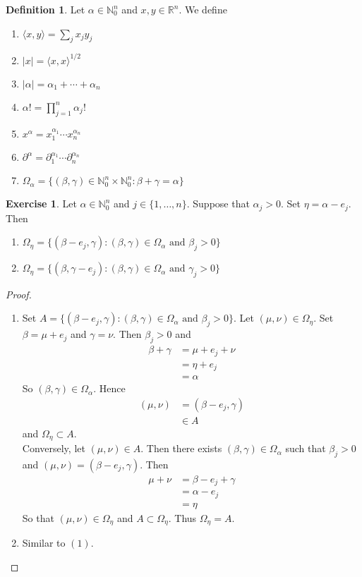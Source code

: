 \documentclass{book}
\theoremstyle{definition}
\newtheorem{defn}[definition]{Definition}
\newtheorem{ex}[definition]{Exercise}
\newcommand{\al}{\alpha}
\newcommand{\be}{\beta}
\newcommand{\gam}{\gamma}
\newcommand{\Om}{\Omega}
\newcommand{\N}{\mathbb{N}}
\newcommand{\R}{\mathbb{R}}
\newcommand{\ld}[1]{\label{defn:#1}}
\DeclareMathOperator*{\0}{\mbf{0}}
\DeclareMathOperator*{\1}{\mbf{1}}
\renewcommand{\r}{\rangle}
\renewcommand{\l}{\langle}
\newcommand{\p}{\partial}
\begin{document}
	\begin{defn}
		\ld{100} Let $\al \in \N_0^n$ and $x, y \in \R^n$. We define 
		\begin{enumerate}
			\item $\l x , y\r  = \sum_{j}x_jy_j$
			\item $|x| = \l x, x\r^{1/2}$
			\item $|\al| = \al_1 + \cdots + \al_n$
			\item $\al! = \prod\limits_{j=1}^n \al_j!$
			\item $x^\al = x_1^{\al_1}\cdots x_n^{\al_n}$
			\item $\p^{\al} = \p_1^{\al_1} \cdots \p_n^{\al_n}$
			\item $\Om_{\al} = \{(\be, \gam) \in \N_0^n \times \N_0^n: \be + \gam = \al\}$
		\end{enumerate}
	\end{defn}

	\begin{ex}
		Let $\al \in \N_0^n$ and $j \in \{1, \ldots, n\}$. Suppose that $\al_j > 0$. Set $\eta = \al - e_j$. Then 
		\begin{enumerate}
			\item $\Om_{\eta} = \{(\be - e_j, \gam): (\be, \gam) \in \Om_{\al} \text{ and } \be_j > 0\}$
			\item $\Om_{\eta} = \{(\be, \gam - e_j): (\be, \gam) \in \Om_{\al} \text{ and } \gam_j > 0\}$
		\end{enumerate}
	\end{ex}

	\begin{proof}\
		\begin{enumerate}
			\item Set $A = \{(\be - e_j, \gam): (\be, \gam) \in \Om_{\al} \text{ and } \be_j > 0\}$. Let $(\mu, \nu) \in \Om_{\eta}$. Set $\be = \mu + e_j$ and $\gam = \nu$. Then $\be_j > 0$ and 
			\begin{align*}
				\be + \gam 
				& = \mu + e_j + \nu \\
				& = \eta + e_j \\
				& = \al 
			\end{align*}
			So $(\be, \gam) \in \Om_{\al}$. Hence
			\begin{align*}
				(\mu, \nu) 
				& = (\be - e_j, \gam) \\
				& \in A
			\end{align*}
			and $\Om_{\eta} \subset A$. \\
			Conversely, let $(\mu, \nu) \in A$. Then there exists $(\be, \gam) \in \Om_{\al}$ such that $\be_j > 0$ and $(\mu, \nu) = (\be - e_j, \gam)$. Then 
			\begin{align*}
				\mu + \nu
				&= \be - e_j + \gam \\
				& = \al - e_j \\
				& = \eta 
			\end{align*}
			So that $(\mu, \nu) \in \Om_{\eta}$ and $A \subset \Om_{\eta}$. Thus $\Om_{\eta} = A$.
			\item Similar to $(1)$.
		\end{enumerate}
	\end{proof}
\end{document}

